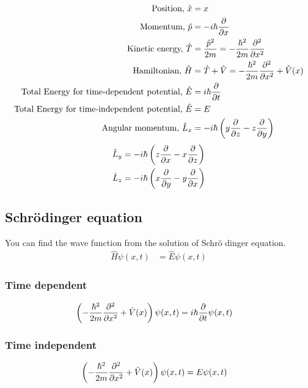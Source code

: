 \begin{align*}
\text{Position, } \hat{x} &= x \\ 
\text{Momentum, } \hat{p} &= -i\hbar\pdv{x} \\
\text{Kinetic energy, } \hat{T} &=  \frac{\hat{p}^{2}}{2m} = -\frac{\hbar^{2}}{2m} \pdv[2]{x}\\
\text{Hamiltonian, } \hat{H} &= \hat{T} + \hat{V} = -\frac{\hbar^{2}}{2m} \pdv[2]{x} + \hat{V}(x) \\
\text{Total Energy for time-dependent potential, } \hat{E} &= i\hbar \pdv{t}\\
\text{Total Energy for time-independent potential, } \hat{E} &= E \\
\text{Angular momentum, } \hat{L}_{x} &= -i\hbar \left( y\pdv{z} - z\pdv{y}\right)
\end{align*}
\begin{align*}
\hat{L}_{y} &= -i\hbar \left( z\pdv{x} - x\pdv{z}\right) \\
\hat{L}_{z} &= -i\hbar \left( x\pdv{y} - y\pdv{x}\right)
\end{align*}

\subsection{Schr\"odinger equation}
You can find the wave function from the solution of Schr\"o dinger equation.
\begin{align}
\hat{H} \psi(x,t) &= \hat{E} \psi(x,t)
\end{align}

\subsubsection{Time dependent}
\begin{align*}
\left(-\frac{\hbar^{2}}{2m} \pdv[2]{x} + \hat{V}(x)\right)\psi(x,t) &=  i\hbar \pdv{t}\psi(x,t)
\end{align*}

\subsubsection{Time independent}
\begin{align*}
\left(-\frac{\hbar^{2}}{2m} \pdv[2]{x} + \hat{V}(x)\right)\psi(x,t) &=  E\psi(x,t)
\end{align*}